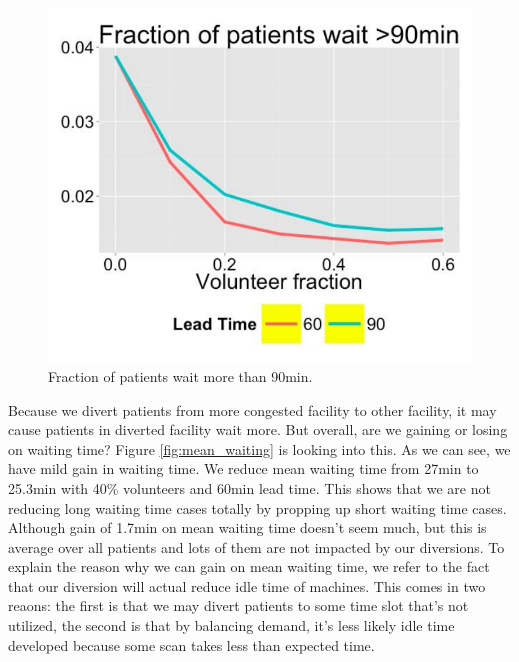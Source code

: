 \begin{figure}
\includegraphics[width=.9\textwidth]{chap3/pic/90min_wait.pdf}
\caption{Fraction of patients wait more than 90min.}
\label{fig:90min}
\end{figure}


Because we divert patients from more congested facility to other
facility, it may cause patients in diverted facility wait more.
But overall, are we gaining or losing on waiting time? Figure
\ref{fig:mean_waiting} is looking into this. As we can see,
we have mild gain in waiting time. We reduce mean waiting time
from 27min to 25.3min with 40\% volunteers and 60min lead time.
This shows that we are not reducing long waiting time cases
totally by propping up short waiting time cases. Although
gain of 1.7min on mean waiting time doesn't seem much, but
this is average over all patients and lots of them are not
impacted by our diversions. To explain the reason why
we can gain on mean waiting time, we refer to the fact that
our diversion will actual reduce idle time of machines. This
comes in two reaons: the first is that we may divert patients
to some time slot that's not utilized, the second is that
by balancing demand, it's less likely idle time developed because
some scan takes less than expected time.

